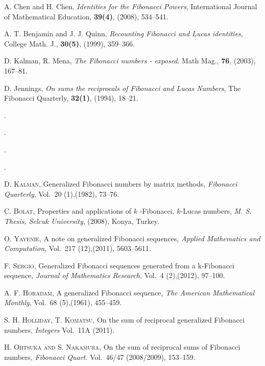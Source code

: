 \begin{thebibliography}{00}
A. Chen and H. Chen, \textit{Identities for the Fibonacci Powers}, International Journal of Mathematical Education, \textbf{39(4)}, (2008), 534--541.

A. T. Benjamin and J. J. Quinn, \textit{Recounting Fibonacci and Lucas identities}, College Math. J., \textbf{30(5)}, (1999), 359--366.

D. Kalman, R. Mena, \textit{The Fibonacci numbers - exposed}. Math Mag., \textbf{76}, (2003), 167--81.

D. Jennings, \textit{On sums the reciprocals of Fibonacci and Lucas Numbers}, The Fibonacci Quarterly, \textbf{32(1)}, (1994), 18--21.

.

.

.

.

 {\textsc{D. Kalman}, Generalized Fibonacci numbers by matrix methods, \emph{Fibonacci Quarterly}, Vol.~{20 (1)},(1982), 73--76}.

\textsc{C. Bolat}, Properties and applications of $k$ -Fibonacci, $k$-Lucas numbers, \emph{M. S. Thesis, Selcuk University}, (2008), Konya, Turkey.

\textsc{O. Yayenie}, A note on generalized Fibonacci sequences, \emph{Applied Mathematics and Computation}, Vol.~{217 (12)},(2011), 5603--5611.

\textsc{F. Sergio}, Generalized Fibonacci sequences generated from a k-Fibonacci sequence, \emph{Journal of Mathematics Research}, Vol.~{4 (2)},(2012), 97--100.

\textsc{A. F. Horadam}, A generalized Fibonacci sequence, \emph{The American Mathematical Monthly}, Vol.~{68 (5)},(1961), 455--459.

\textsc{S. H. Holliday, T. Komatsu}, On the sum of reciprocal generalized Fibonacci numbers, \emph{ Integers} Vol.~{11A} (2011).

\textsc{H. Ohtsuka and S. Nakamura}, On the sum of reciprocal sums of Fibonacci numbers, \emph{ Fibonacci Quart.} Vol.~{46/47} (2008/2009), 153--159.


\end{thebibliography}
